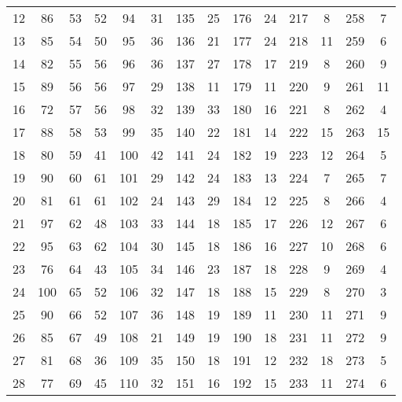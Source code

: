 \begin{table}[H]
\begin{tabular}{S S | S S | S S | S S | S S | S S | S S}
        12  &   86  &  53  &   52  &  94  &   31  &  135 &   25  &  176 &   24  &   217 &    8  &  258 &    7  \\
        13  &   85  &  54  &   50  &  95  &   36  &  136 &   21  &  177 &   24  &   218 &   11  &  259 &    6  \\
        14  &   82  &  55  &   56  &  96  &   36  &  137 &   27  &  178 &   17  &   219 &    8  &  260 &    9  \\
        15  &   89  &  56  &   56  &  97  &   29  &  138 &   11  &  179 &   11  &   220 &    9  &  261 &   11  \\
        16  &   72  &  57  &   56  &  98  &   32  &  139 &   33  &  180 &   16  &   221 &    8  &  262 &    4  \\
        17  &   88  &  58  &   53  &  99  &   35  &  140 &   22  &  181 &   14  &   222 &   15  &  263 &   15  \\
        18  &   80  &  59  &   41  &  100 &   42  &  141 &   24  &  182 &   19  &   223 &   12  &  264 &    5  \\
        19  &   90  &  60  &   61  &  101 &   29  &  142 &   24  &  183 &   13  &   224 &    7  &  265 &    7  \\
        20  &   81  &  61  &   61  &  102 &   24  &  143 &   29  &  184 &   12  &   225 &    8  &  266 &    4  \\
        21  &   97  &  62  &   48  &  103 &   33  &  144 &   18  &  185 &   17  &   226 &   12  &  267 &    6  \\
        22  &   95  &  63  &   62  &  104 &   30  &  145 &   18  &  186 &   16  &   227 &   10  &  268 &    6  \\
        23  &   76  &  64  &   43  &  105 &   34  &  146 &   23  &  187 &   18  &   228 &    9  &  269 &    4  \\
        24  &  100  &  65  &   52  &  106 &   32  &  147 &   18  &  188 &   15  &   229 &    8  &  270 &    3  \\
        25  &   90  &  66  &   52  &  107 &   36  &  148 &   19  &  189 &   11  &   230 &   11  &  271 &    9  \\
        26  &   85  &  67  &   49  &  108 &   21  &  149 &   19  &  190 &   18  &   231 &   11  &  272 &    9  \\
        27  &   81  &  68  &   36  &  109 &   35  &  150 &   18  &  191 &   12  &   232 &   18  &  273 &    5  \\
        28  &   77  &  69  &   45  &  110 &   32  &  151 &   16  &  192 &   15  &   233 &   11  &  274 &    6  \\

\end{tabular}
\end{table}
